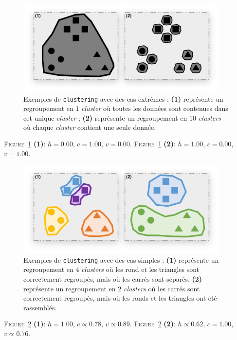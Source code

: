 		\begin{figure}[H]
			\centering
			\includegraphics[width=0.95\textwidth]{figures/annexe-vmeasure-cas-extremes}
			\caption{
				Exemples de \texttt{clustering} avec des cas extrêmes :
				\textbf{(1)} représente un regroupement en $1$ \textit{cluster} où toutes les données sont contenues dans cet unique \textit{cluster} ;
				\textbf{(2)} représente un regroupement en $10$ \textit{clusters} où chaque \textit{cluster} contient une seule donnée.
			}
			\label{figure:D.2-ANNEXE-EVALUATION-CLUSTERING-EXEMPLE-VMEASURE-1-CAS-EXTREME}
		\end{figure}
			\textsc{Figure~\ref{figure:D.2-ANNEXE-EVALUATION-CLUSTERING-EXEMPLE-VMEASURE-1-CAS-EXTREME}} \textbf{(1)}: $h = 0.00$, $c = 1.00$, $v = 0.00$.
			\textsc{Figure~\ref{figure:D.2-ANNEXE-EVALUATION-CLUSTERING-EXEMPLE-VMEASURE-1-CAS-EXTREME}} \textbf{(2)}: $h = 1.00$, $c = 0.00$, $v = 1.00$.
	
		\begin{figure}[H]
			\centering
			\includegraphics[width=0.95\textwidth]{figures/annexe-vmeasure-cas-simples}
			\caption{
				Exemples de \texttt{clustering} avec des cas simples :
				\textbf{(1)} représente un regroupement en $4$ \textit{clusters} où les rond et les triangles sont correctement regroupés, mais où les carrés sont séparés.
				\textbf{(2)} représente un regroupement en $2$ \textit{clusters} où les carrés sont correctement regroupés, mais où les ronds et les triangles ont été rassemblés.
			}
			\label{figure:D.2-ANNEXE-EVALUATION-CLUSTERING-EXEMPLE-VMEASURE-2-CAS-SIMPLES}
		\end{figure}
			\textsc{Figure~\ref{figure:D.2-ANNEXE-EVALUATION-CLUSTERING-EXEMPLE-VMEASURE-2-CAS-SIMPLES}} \textbf{(1)}: $h = 1.00$, $c \propto 0.78$, $v \propto 0.89$.
			\textsc{Figure~\ref{figure:D.2-ANNEXE-EVALUATION-CLUSTERING-EXEMPLE-VMEASURE-2-CAS-SIMPLES}} \textbf{(2)}: $h \propto 0.62$, $c = 1.00$, $v \propto 0.76$.
	
	